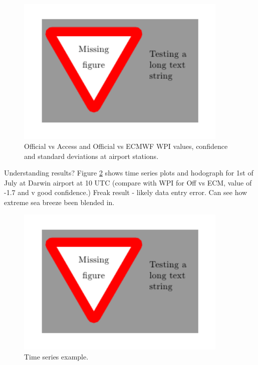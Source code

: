 \documentclass[alpha-refs]{wiley-article}
\begin{document}
\begin{figure}
\centering
\includegraphics[keepaspectratio=true,width=0.90\textwidth]{figure_placeholder.png}
\caption{Official vs Access and Official vs ECMWF WPI values, confidence and standard deviations at airport stations.}
\label{Fig:airport_wpi}
\end{figure}

Understanding results? Figure \ref{Fig:time_series_and_hodo} shows time series plots and hodograph for 1st of July at Darwin airport at 10 UTC (compare with WPI for Off vs ECM, value of -1.7 and v good confidence.) Freak result - likely data entry error. Can see how extreme sea breeze been blended in.

\begin{figure}
\centering
\includegraphics[keepaspectratio=true,width=0.90\textwidth]{figure_placeholder.png}
\caption{Time series example.}
\label{Fig:time_series_and_hodo}
\end{figure}
\end{document}

